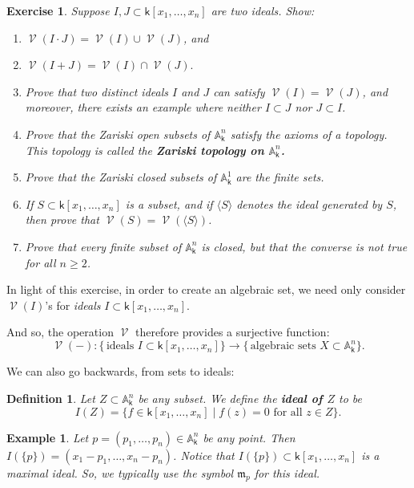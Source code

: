 \documentclass[11pt]{article}
\newcommand{\A}{\mathbb{A}}
\renewcommand{\k}{\mathsf{k}}
\newcommand{\fm}{\mathfrak{m}}
\renewcommand{\to}{\longrightarrow}
\DeclareMathOperator{\V}{\mathcal{V}}
\newcommand{\A}{\mathbb A}
\renewcommand{\k}{\mathsf{k}}
\renewcommand{\to}{{\longrightarrow}}
\newtheorem{definition}{Definition}[section]
\newtheorem{eg}{Example}[section]
\newtheorem{exercise}{Exercise}[section]
\begin{document}
\begin{exercise}
Suppose \(I,J \subset \k[x_1, \dots, x_n]\) are two ideals. Show:
\begin{enumerate}
\item \(\V(I \cdot J) = \V(I) \cup \V(J)\), and
\item \(\V(I+J) = \V(I) \cap \V(J).\)
\item Prove that two distinct ideals \(I\) and \(J\) can satisfy \(\V(I) = \V(J)\), and moreover, there exists an example where neither \(I \subset J\) nor \(J \subset I\).
\item Prove that the Zariski open subsets of \(\A^{n}_{\k}\) satisfy the axioms of a topology. This topology is called the \textbf{\emph{Zariski topology on \(\A^n_{\k}\).}}
\item Prove that the Zariski closed subsets of \(\A^{1}_{\k}\) are the finite sets.
\item If \(S \subset \k[x_1, \dots, x_n]\) is a subset, and if \(\langle S \rangle\) denotes the ideal generated by \(S\), then prove that \(\V(S) = \V(\langle S \rangle)\).
\item Prove that every finite subset of \(\A^{n}_{\k}\) is closed, but that the converse is not true for all \(n \geq 2\).
\end{enumerate}
\end{exercise}

In light of this exercise, in order to create an algebraic set, we need only consider \(\V(I)\)'s for \emph{ideals} \(I \subset \k[x_1, \dots,
x_n]\).

And so, the operation \(\V\) therefore provides a surjective function: \[\V(-): \big\{\,\textrm{ideals} \,\, I \subset \k[x_1, \dots, x_n] \big\} \to \big\{\,\textrm{algebraic sets} \,\, X \subset \A^{n}_{\k} \big\}.\]

We can also go backwards, from sets to ideals:

\begin{definition}
Let \(Z \subset \A^n_{\k}\) be any subset.  We define the \textbf{\emph{ideal of \(Z\)}} to be \[I(Z) = \big\{ f \in \k[x_1,\dots,x_n] \mid f(z)=0\,\, \textrm{for all}\,\,z \in Z \big\}.\]
\end{definition}

\begin{eg}
Let \(p = (p_1, \dots, p_n) \in \A^n_{\k}\) be any point. Then \(I(\{p\}) = (x_1-p_1, \dots, x_n-p_n)\). Notice that \(I(\{p\}) \subset \k[x_1,\dots, x_n]\) is a \emph{maximal ideal}.  So, we typically use the symbol \(\fm_p\) for this ideal.
\end{eg}
\end{document}
